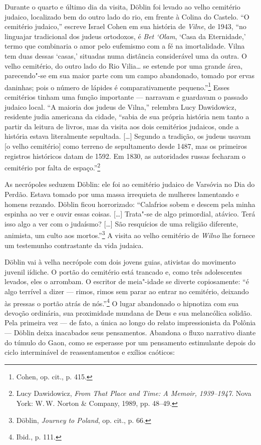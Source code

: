 Durante o quarto e último dia da visita, Döblin foi levado ao velho
cemitério judaico, localizado bem do outro lado do rio, em frente à
Colina do Castelo. ``O cemitério judaico,'' escreve Israel Cohen em sua
história de \textit{Vilne}, de 1943, ``no linguajar tradicional dos judeus
ortodoxos, é \textit{Bet `Olam}, `Casa da Eternidade,' termo que
combinaria o amor pelo eufemismo com a fé na imortalidade. Vilna tem
duas dessas `casas,' situadas numa distância considerável uma da outra.
O velho cemitério, do outro lado do Rio Vilia\ldots{} se estende por uma
grande área, parecendo"-se em sua maior parte com um campo abandonado,
tomado por ervas daninhas; pois o número de lápides é comparativamente
pequeno.''\footnote{Cohen, op. cit., p. 415.} Esses cemitérios tinham
uma função importante --- narravam e guardavam o passado judaico local.
``A maioria dos judeus de Vilna,'' relembra Lucy Dawidowicz, residente
judia americana da cidade, ``sabia de sua própria história nem tanto a
partir da leitura de livros, mas da visita aos dois cemitérios judaicos,
onde a história estava literalmente sepultada. [\ldots{}] Segundo a
tradição, os judeus usavam {[}o velho cemitério{]} como terreno de
sepultamento desde 1487, mas os primeiros registros históricos datam de
1592. Em 1830, as autoridades russas fecharam o cemitério por falta de
espaço.''\footnote{Lucy Dawidowicz, \textit{From That Place and Time: A Memoir, 1939--1947}. Nova York: W.\,W. Norton \& Company, 1989, pp. 48--49.}

As necrópoles seduzem Döblin: ele foi ao cemitério judaico de Varsóvia
no Dia do Perdão. Estava tomado por uma massa irrequieta de mulheres
lamentando e homens rezando. Döblin ficou horrorizado: ``Calafrios sobem
e descem pela minha espinha ao ver e ouvir essas coisas. [\ldots{}]
Trata"-se de algo primordial, atávico. Terá isso algo a ver com o
judaísmo? [\ldots{}] São resquícios de uma religião diferente, animista,
um culto aos mortos.''\footnote{Döblin, \textit{Journey to Poland}, op. cit., p. 66.} A visita ao velho cemitério de \textit{Wilno} lhe fornece um testemunho contrastante da vida judaica.

Döblin vai à velha necrópole com dois jovens guias, ativistas do
movimento juvenil iídiche. O portão do cemitério está trancado e, como
três adolescentes levados, eles o arrombam. O escritor de meia"-idade se
diverte copiosamente: ``é algo terrível a dizer --- rimos, rimos sem parar
ao entrar no cemitério, deixando às pressas o portão atrás de
nós.''\footnote{Ibid., p. 111.} O lugar abandonado o hipnotiza com sua
devoção ordinária, sua proximidade mundana de Deus e sua melancólica
solidão. Pela primeira vez --- de fato, a única ao longo do relato
impressionista da Polônia --- Döblin deixa inacabados seus pensamentos.
Abandona o fluxo narrativo diante do túmulo do Gaon, como se esperasse
por um pensamento estimulante depois do ciclo interminável de
reassentamentos e exílios caóticos:

